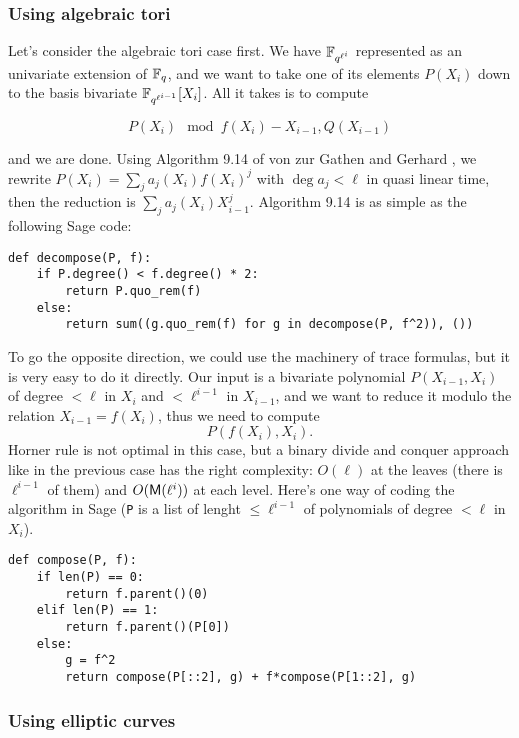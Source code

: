 \documentclass[11pt]{article}
\begin{document}
\subsubsection{Using algebraic tori}

Let's consider the algebraic tori case first. We have
$\mathbb{F}_{q^{\ell^i}}$ represented as an univariate extension of $\mathbb{F}_q$,
and we want to take one of its elements $P(X_i)$ down to the basis
bivariate $\mathbb{F}_{q^{\ell^{i-1}}}[X_i]$. All it takes is to compute

\begin{equation}
  P(X_i) \mod f(X_i) - X_{i-1}, Q(X_{i-1})
\end{equation}

and we are done. Using Algorithm 9.14 of von zur Gathen and Gerhard
\cite{vzGG}, we rewrite $P(X_i)=\sum_j a_j(X_i)f(X_i)^j$ with $\deg
a_j<\ell$ in quasi linear time, then the reduction is $\sum_j
a_j(X_i)X_{i-1}^j$. Algorithm 9.14 is as simple as the following Sage
code:

\begin{verbatim}
def decompose(P, f):
    if P.degree() < f.degree() * 2:
        return P.quo_rem(f)
    else:
        return sum((g.quo_rem(f) for g in decompose(P, f^2)), ())
\end{verbatim}

To go the opposite direction, we could use the machinery of trace
formulas, but it is very easy to do it directly. Our input is a
bivariate polynomial $P(X_{i-1},X_i)$ of degree $<\ell$ in $X_i$ and
$<\ell^{i-1}$ in $X_{i-1}$, and we want to reduce it modulo the
relation $X_{i-1}=f(X_i)$, thus we need to compute
\begin{equation}
  P(f(X_i), X_i).  
\end{equation}
Horner rule is not optimal in this case, but a binary divide and
conquer approach like in the previous case has the right complexity:
$O(\ell)$ at the leaves (there is $\ell^{i-1}$ of them) and
$O(\mathsf{M}(\ell^i))$ at each level. Here's one way of coding the
algorithm in Sage (\verb+P+ is a list of lenght $\le\ell^{i-1}$ of
polynomials of degree $<\ell$ in $X_i$).

\begin{verbatim}
def compose(P, f):
    if len(P) == 0:
        return f.parent()(0)
    elif len(P) == 1:
        return f.parent()(P[0])
    else:
        g = f^2
        return compose(P[::2], g) + f*compose(P[1::2], g)
\end{verbatim}


\subsubsection{Using elliptic curves}
    
\end{document}
